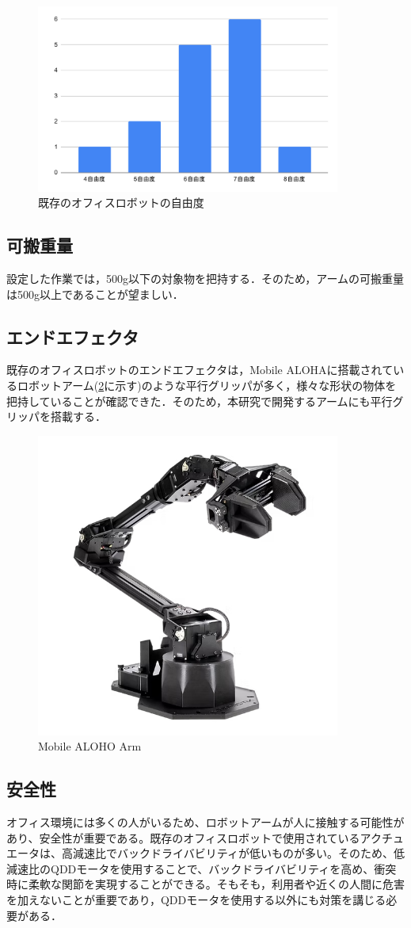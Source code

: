 \begin{figure}[h]
  \centering
  \includegraphics[width=10cm]{images/armDof.pdf}
  \caption{既存のオフィスロボットの自由度}
  \label{fig:armDof}
\end{figure}

\subsection{可搬重量}
設定した作業では，500g以下の対象物を把持する．そのため，アームの可搬重量は500g以上であることが望ましい．
\subsection{エンドエフェクタ}
既存のオフィスロボットのエンドエフェクタは，Mobile ALOHAに搭載されているロボットアーム(\ref{fig:alohaarm}に示す)のような平行グリッパが多く，様々な形状の物体を把持していることが確認できた．そのため，本研究で開発するアームにも平行グリッパを搭載する．

\begin{figure}[h]
  \centering
  \includegraphics[width=10cm]{images/alohaarm.png}
  \caption{Mobile ALOHO Arm}
  \label{fig:alohaarm}
\end{figure}

\subsection{安全性}
オフィス環境には多くの人がいるため、ロボットアームが人に接触する可能性があり、安全性が重要である。既存のオフィスロボットで使用されているアクチュエータは、高減速比でバックドライバビリティが低いものが多い。そのため、低減速比のQDDモータを使用することで、バックドライバビリティを高め、衝突時に柔軟な関節を実現することができる。そもそも，利用者や近くの人間に危害を加えないことが重要であり，QDDモータを使用する以外にも対策を講じる必要がある．
\newpage